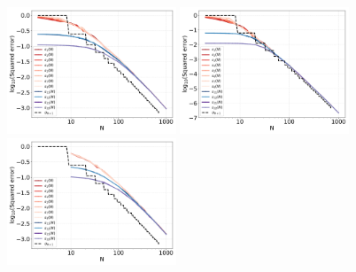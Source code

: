 \documentclass[twoside,11pt]{book}
\numberwithin{theorem}{chapter}
\numberwithin{definition}{chapter}
\numberwithin{proposition}{chapter}
\numberwithin{corollary}{chapter}
\numberwithin{example}{chapter}
\numberwithin{lemma}{chapter}
\numberwithin{assumption}{chapter}
\numberwithin{equation}{chapter}
\numberwithin{figure}{chapter}
\begin{document}
\begin{figure}
\centering
\includegraphics[width=0.45\textwidth]{img/neurips/multiSobolev/multig_interpolation_Korobov_s_1_fig_1.pdf}
\includegraphics[width=0.45\textwidth]{img/neurips/multiSobolev/multig_interpolation_Korobov_s_2_fig_1.pdf}\\
\includegraphics[width=0.45\textwidth]{img/neurips/multiSobolev/LVSQ_multig_interpolation_Korobov_s_1_fig_1.pdf}

\end{figure}
\end{document}
